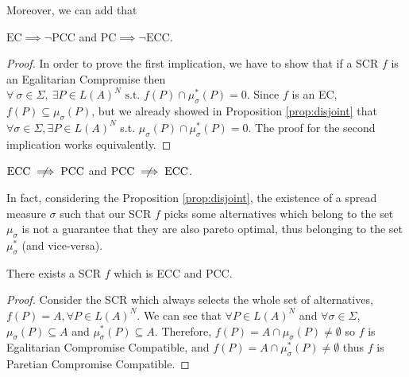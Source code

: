 \documentclass[version=3.21, pagesize, notitlepage, twoside=off, bibliography=totoc, DIV=calc, fontsize=12pt, a4paper]{scrartcl}
\newcommand{\musigma}{\mu_{\sigma}}
\newcommand{\mustar}{\mu_{\sigma}^*}
\begin{document}
Moreover, we can add that
\begin{proposition}
	$\text{EC} \implies \lnot \text{PCC}$ and $\text{PC} \implies \lnot \text{ECC}$.
\end{proposition}
\begin{proof}
	In order to prove the first implication, we have to show that if a SCR $f$ is an Egalitarian Compromise then $\forall \ \sigma \in \Sigma , \ \exists P \in L(A)^N  \text{ s.t. }f(P) \cap \mustar(P) = 0$. Since $f$ is an EC, $f(P) \subseteq \musigma(P)$, but we already showed in Proposition \ref{prop:disjoint} that $\forall \sigma \in \Sigma, \exists P \in L(A)^N $ s.t. $\musigma(P)\cap\mustar(P)=0$. The proof for the second implication works equivalently.
\end{proof}


\begin{proposition}
	$\text{ECC} \centernot \implies \text{PCC}$ and $\text{PCC} \centernot \implies \text{ECC}$.
\end{proposition}
 In fact, considering the Proposition \ref{prop:disjoint}, the existence of a spread measure $\sigma$ such that our SCR $f$ picks some alternatives which belong to the set $\musigma$ is not a guarantee that they are also pareto optimal, thus belonging to the set $\mustar$ (and vice-versa).


\begin{proposition}
	There exists a SCR $f$ which is ECC and PCC.
\end{proposition}
\begin{proof}
	Consider the SCR which always selects the whole set of alternatives, $f(P)=A, \forall P \in L(A)^N$. We can see that $\forall P \in L(A)^N$ and $\forall \sigma \in \Sigma$, $\musigma(P) \subseteq A$ and $\mustar(P) \subseteq A$. Therefore, $f(P)=A \cap \musigma(P) \neq \emptyset$ so $f$ is Egalitarian Compromise Compatible, and $f(P)=A \cap \mustar(P) \neq \emptyset$ thus $f$ is Paretian Compromise Compatible.
\end{proof}
\end{document}

